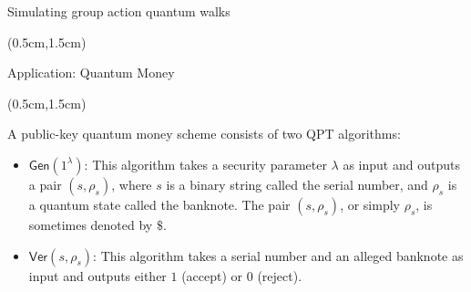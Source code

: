 \documentclass{beamer}
\theoremstyle{definition}
\newcommand{\gen}{\mathsf{Gen}}
\newcommand{\ver}{\mathsf{Ver}}
\begin{document}
    




        






\begin{frame}{Simulating group action quantum walks}
    
    \begin{textblock*}{12cm}(0.5cm,1.5cm)

       

    \end{textblock*}

\end{frame}









\begin{frame}{Application: Quantum Money}
    
    \begin{textblock*}{12cm}(0.5cm,1.5cm)
            
        A public-key quantum money scheme consists of two QPT algorithms:
        \vspace{1cm} 
        \begin{itemize}
        \item $\gen(1^\lambda)$: This algorithm takes a security parameter $\lambda$ as input and outputs a pair $(s, \rho_s)$, where $s$ is a binary string called the serial number, and $\rho_s$ is a quantum state called the banknote. The pair $(s, \rho_s)$, or simply $\rho_s$, is sometimes denoted by $\$$.
        
        \vspace{1cm}
        \item $\ver(s, \rho_s)$: This algorithm takes a serial number and an alleged banknote as input and outputs either $1$ (accept) or $0$ (reject).
        \end{itemize}

    \end{textblock*}


\end{frame}
\end{document}
